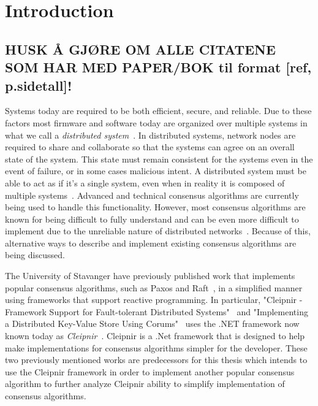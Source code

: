 \chapter{Introduction}
\section*{HUSK Å GJØRE OM ALLE CITATENE SOM HAR MED PAPER/BOK til format [ref, p.sidetall]!}
Systems today are required to be both efficient, secure, and reliable. Due to these factors most firmware and software today are organized over multiple systems in what we call a \textit{distributed system}~\cites{WEB:DistSys}[p.~16]{BOOK:MVstandver3}. In distributed systems, network nodes are required to share and collaborate so that the systems can agree on an overall state of the system. This state must remain consistent for the systems even in the event of failure, or in some cases malicious intent. A distributed system must be able to act as if it's a single system, even when in reality it is composed of multiple systems~\cite[p.~18]{BOOK:MVstandver3}. Advanced and technical consensus algorithms are currently being used to handle this functionality.
However, most consensus algorithms are known for being difficult to fully understand and can be even more difficult to implement due to the unreliable nature of distributed networks~\cites[p.~459]{BOOK:MVstandver3}[p.~13]{PAPER:EivindPaper}. Because of this, alternative ways to describe and implement existing consensus algorithms are being discussed.

The University of Stavanger have previously published work that implements popular consensus algorithms, such as Paxos and Raft~\cite{WEB:ConsesAlgo}, in a simplified manner using frameworks that support reactive programming. In particular, "Cleipnir - Framework Support for Fault-tolerant Distributed Systems"~\cite{PAPER:PaxosCleipnir} and "Implementing a Distributed Key-Value Store Using Corums"~\cite{PAPER:EivindPaper} uses the .NET framework now known today as \textit{Cleipnir}~\cite{DOC:Cleipnir}.
Cleipnir is a .Net framework that is designed to help make implementations for consensus algorithms simpler for the developer.
These two previously mentioned works are predecessors for this thesis which intends to use the Cleipnir framework in order to implement another popular consensus algorithm to further analyze Cleipnir ability to simplify implementation of consensus algorithms.

